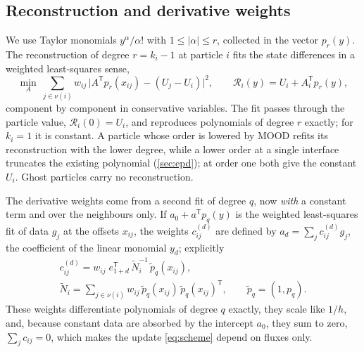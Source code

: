 \documentclass[smallextended]{svjour3}
\numberwithin{equation}{section}
\newcommand{\nb}{\nu}
\newcommand{\ptil}{\tilde p}
\newcommand{\Ntil}{\tilde N}
\begin{document}
\subsection{Reconstruction and derivative weights}\label{sec:recfit}

We use Taylor monomials $y^\alpha/\alpha!$ with $1\le|\alpha|\le r$, collected in the vector $p_r(y)$. The reconstruction of degree $r=k_i-1$ at particle $i$ fits the state differences in a weighted least-squares sense,
\begin{equation}\label{eq:recfit}
\min_{A}\ \sum_{j\in\nb(i)} w_{ij}\,\big| A^{\mathsf T}p_r(x_{ij}) - (U_j - U_i)\big|^2 ,\qquad
\mathcal{R}_i(y) = U_i + A_i^{\mathsf T}p_r(y),
\end{equation}
component by component in conservative variables. The fit passes through the particle value, $\mathcal{R}_i(0)=U_i$, and reproduces polynomials of degree $r$ exactly; for $k_i=1$ it is constant. A particle whose order is lowered by MOOD refits its reconstruction with the lower degree, while a lower order at a single interface truncates the existing polynomial (\cref{sec:epd}); at order one both give the constant $U_i$. Ghost particles carry no reconstruction.

The derivative weights come from a second fit of degree $q$, now \emph{with} a constant term and over the neighbours only. If $a_0+a^{\mathsf T}p_q(y)$ is the weighted least-squares fit of data $g_j$ at the offsets $x_{ij}$, the weights $c^{(d)}_{ij}$ are defined by $a_d=\sum_jc^{(d)}_{ij}g_j$, the coefficient of the linear monomial $y_d$; explicitly
\begin{equation}\label{eq:cij}
\begin{gathered}
c^{(d)}_{ij} = w_{ij}\; e_{1+d}^{\mathsf T}\,\Ntil_i^{-1}\,\ptil_q(x_{ij}),\\
\Ntil_i=\sum_{j\in\nb(i)} w_{ij}\,\ptil_q(x_{ij})\,\ptil_q(x_{ij})^{\mathsf T},\qquad \ptil_q=(1,p_q).
\end{gathered}
\end{equation}
These weights differentiate polynomials of degree $q$ exactly, they scale like $1/h$, and, because constant data are absorbed by the intercept $a_0$, they sum to zero, $\sum_jc_{ij}=0$, which makes the update \eqref{eq:scheme} depend on fluxes only.
\end{document}
